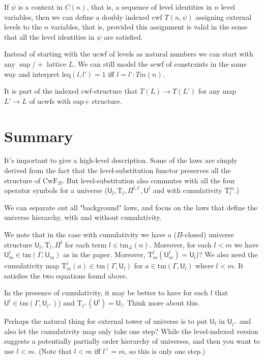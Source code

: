 \documentclass[11pt,a4paper]{article}
\theoremstyle{definition}
\newcommand{\Tm}{\mathrm{Tm}}
\def\Tm{\mathrm{tm}}
\def\leq{\mathrm{leq}}
\newcommand{\tm}{\mathrm{tm}}
\def\U{\mathsf{U}}
\newcommand{\Ta}{\mathrm{T}}
\def\L{{\mathcal{L}}}
\def\CwF{\mathrm{CwF}}
\begin{document}
If $\psi$ is a context in $C(n)$, that is, a sequence of level identities in $n$ level variables, then we can define a doubly indexed cwf $T(n, \psi)$ assigning external levels to the $n$ variables, that is, provided this assignment is valid in the sense that all the level identities in $\psi$ are satisfied.
 
Instead of starting with the ucwf of levels as natural numbers we can start with any $\sup/+$ lattice $L$.  We can still model the scwf of constraints in the same way and interpret $\leq(l,l’) = 1$ iff $ l = l’ : Tm(n)$.
 
It is part of the indexed cwf-structure that $T(L) \to T(L’)$ for any map $L’ \to L$ of ucwfs with sup+ structure.

\section{Summary}

It's important to give a high-level description. Some of the laws are simply derived from the fact that the level-substitution functor preserves all the structure of $\CwF_\Pi$. But level-substitution also commutes with all the four operator symbols for a universe ($\U_l, \Ta_l, \Pi^{l,l'},\U^{l}$ and with cumulativity $\Ta^m_l$.)

We can separate out all "background" laws, and focus on the laws that define the universe hierarchy, with and without cumulativity.

We note that in the case with cumulativity we have a ($\Pi$-closed) universe structure $\U_l, \Ta_l, \Pi^{l}$ for each term $l \in \tm_\L(n)$. Moreover, for each $l<m$ we have $\U^l_m \in \Tm(\Gamma,\U_{m})$ as in the paper. Moreover, %
$\Ta^l_{m}(\U^l_m) = \U_l$)? We also need the cumulativity map $\Ta^l_m(a) \in \Tm(\Gamma,\U_l)$ for $a \in \Tm(\Gamma,\U_l)$ where $l  < m$. It satisfies the two equations found above.

In the presence of cumulativity, it may be better to have for each $l$ that $\U^l \in \Tm(\Gamma,\U_{l^+})$) and $\Ta_{l^+}(\U^l) = \U_l$. Think more about this.

Perhaps the natural thing for external tower of universe is to put $\U_l$ in $\U_{l^+}$ and also let the cumulativity map only take one step? While the level-indexed version suggests a potentially partially order hierarchy of universes, and then you want to use $l < m$. (Note that $l < m$ iff $l^+ = m$, so this is only one step.)

\appendix
\end{document}
